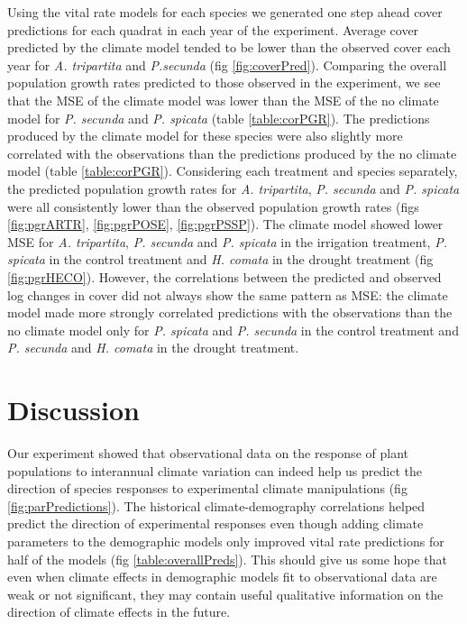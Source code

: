 \documentclass[11pt]{article}
\begin{document}
\begin{doublespacing}
Using the vital rate models for each species we generated one step ahead cover predictions for each quadrat in each year of the experiment.  Average cover predicted by the climate model tended to be lower than the observed cover each year for \textit{A. tripartita} and \textit{P.secunda} (fig \ref{fig:coverPred}). Comparing the overall population growth rates predicted to those observed in the experiment, we see that the MSE of the climate model was lower than the MSE of the no climate model for \textit{P. secunda} and \textit{P. spicata} (table \ref{table:corPGR}). The predictions produced by the climate model for these species were also slightly more correlated with the observations than the predictions produced by the no climate model (table \ref{table:corPGR}). Considering each treatment and species separately, the predicted population growth rates for \textit{A. tripartita}, \textit{P. secunda} and \textit{P. spicata} were all consistently lower than the observed population growth rates (figs \ref{fig:pgrARTR}, \ref{fig:pgrPOSE}, \ref{fig:pgrPSSP}). The climate model showed lower MSE for \textit{A. tripartita}, \textit{P. secunda} and \textit{P. spicata} in the irrigation treatment, \textit{P. spicata} in the control treatment and \textit{H. comata} in the drought treatment (fig \ref{fig:pgrHECO}).  However, the correlations between the predicted and observed log changes in cover did not always show the same pattern as MSE: the climate model made more strongly correlated predictions with the observations than the no climate model only for \textit{P. spicata} and \textit{P. secunda} in the control treatment and \textit{P. secunda} and \textit{H. comata} in the drought treatment. 
  

\section*{Discussion}

Our experiment showed that observational data on the response of plant populations to interannual climate variation can indeed help us predict the direction of species responses to experimental climate manipulations (fig \ref{fig:parPredictions}). The historical climate-demography correlations helped predict the direction of experimental responses even though adding climate parameters to the demographic models only improved vital rate predictions for half of the models (fig \ref{table:overallPreds}). This should give us some hope that even when climate effects in demographic models fit to observational data are weak or not significant, they may contain useful qualitative information on the direction of climate effects in the future. 


\end{doublespacing}
\end{document}
